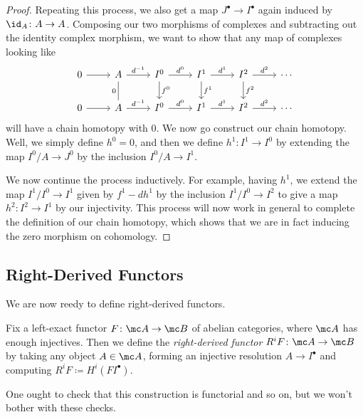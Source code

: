 \documentclass[../notes.tex]{subfiles}
\begin{document}
\begin{proof}
	Repeating this process, we also get a map $J^\bullet\to I^\bullet$ again induced by $\id_A\colon A\to A$. Composing our two morphisms of complexes and subtracting out the identity complex morphism, we want to show that any map of complexes looking like
	\[\begin{tikzcd}
		0 & A & {I^0} & {I^1} & {I^2} & \cdots \\
		0 & A & {I^0} & {I^1} & {I^2} & \cdots
		\arrow[from=1-1, to=1-2]
		\arrow["{d^{-1}}", from=1-2, to=1-3]
		\arrow["{d^0}", from=1-3, to=1-4]
		\arrow["{d^1}", from=1-4, to=1-5]
		\arrow["{d^2}", from=1-5, to=1-6]
		\arrow[from=2-1, to=2-2]
		\arrow["{d^{-1}}", from=2-2, to=2-3]
		\arrow["{d^0}", from=2-3, to=2-4]
		\arrow["{d^1}", from=2-4, to=2-5]
		\arrow["{d^2}", from=2-5, to=2-6]
		\arrow["0"', no head, from=1-2, to=2-2]
		\arrow["{f^0}", from=1-3, to=2-3]
		\arrow["{f^1}", from=1-4, to=2-4]
		\arrow["{f^2}", from=1-5, to=2-5]
	\end{tikzcd}\]
	will have a chain homotopy with $0$. We now go construct our chain homotopy. Well, we simply define $h^0=0$, and then we define $h^1\colon I^1\to I^0$ by extending the map $I^0/A\to J^0$ by the inclusion $I^0/A\to I^1$.

	We now continue the process inductively. For example, having $h^1$, we extend the map $I^1/I^0\to I^1$ given by $f^1-dh^1$ by the inclusion $I^1/I^0\to I^2$ to give a map $h^2\colon I^2\to I^1$ by our injectivity. This process will now work in general to complete the definition of our chain homotopy, which shows that we are in fact inducing the zero morphism on cohomology.
\end{proof}

\subsection{Right-Derived Functors}
We are now reedy to define right-derived functors.
\begin{definition}
	Fix a left-exact functor $F\colon\mc A\to\mc B$ of abelian categories, where $\mc A$ has enough injectives. Then we define the \textit{right-derived functor} $R^iF\colon\mc A\to\mc B$ by taking any object $A\in\mc A$, forming an injective resolution $A\to I^\bullet$ and computing $R^iF\coloneqq H^i(FI^\bullet)$.
\end{definition}
One ought to check that this construction is functorial and so on, but we won't bother with these checks.
\end{document}
